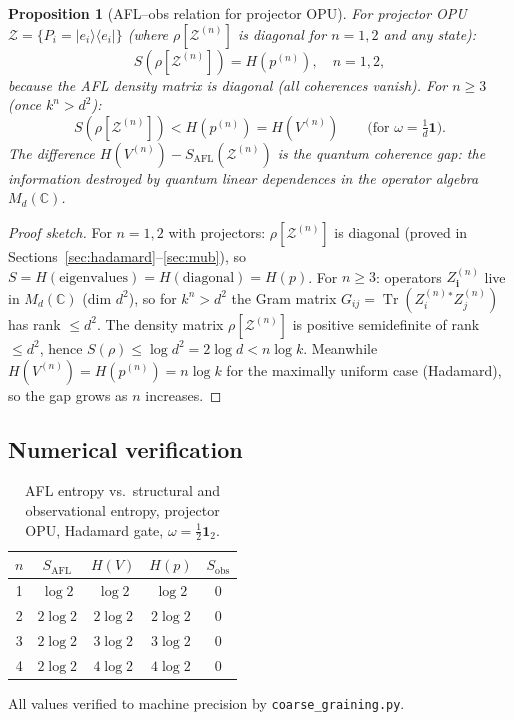 \documentclass[12pt,a4paper]{article}
\newtheorem{proposition}[theorem]{Proposition}
\DeclareMathOperator{\Tr}{Tr}
\begin{document}
\begin{proposition}[AFL--obs relation for projector OPU]\label{prop:afl_obs}
For projector OPU $\mathcal{Z}=\{P_i=|e_i\rangle\langle e_i|\}$ (where $\rho[\mathcal{Z}^{(n)}]$
is diagonal for $n=1,2$ and any state):
\begin{equation}\label{eq:afl_obs_proj}
  S(\rho[\mathcal{Z}^{(n)}]) = H(p^{(n)}), \quad n=1,2,
\end{equation}
because the AFL density matrix is diagonal (all coherences vanish).
For $n\geq 3$ (once $k^n>d^2$):
\begin{equation}\label{eq:quantum_gap}
  S(\rho[\mathcal{Z}^{(n)}])
  < H(p^{(n)}) = H(V^{(n)})
  \qquad\text{(for }\omega=\tfrac{1}{d}\mathbf{1}\text{).}
\end{equation}
The difference $H(V^{(n)})-S_{\mathrm{AFL}}(\mathcal{Z}^{(n)})$ is the
\emph{quantum coherence gap}: the information destroyed by quantum
linear dependences in the operator algebra $M_d(\mathbb{C})$.
\end{proposition}
\begin{proof}[Proof sketch]
For $n=1,2$ with projectors: $\rho[\mathcal{Z}^{(n)}]$ is diagonal
(proved in Sections~\ref{sec:hadamard}--\ref{sec:mub}), so
$S = H(\text{eigenvalues}) = H(\text{diagonal}) = H(p)$.
For $n\geq 3$: operators $Z^{(n)}_\mathbf{i}$ live in $M_d(\mathbb{C})$ (dim $d^2$),
so for $k^n>d^2$ the Gram matrix $G_{ij}=\Tr(Z^{(n)}_i{}^* Z^{(n)}_j)$ has
rank $\leq d^2$.  The density matrix $\rho[\mathcal{Z}^{(n)}]$ is positive
semidefinite of rank $\leq d^2$, hence $S(\rho)\leq\log d^2 = 2\log d < n\log k$.
Meanwhile $H(V^{(n)}) = H(p^{(n)}) = n\log k$ for the maximally uniform case
(Hadamard), so the gap grows as $n$ increases.
\end{proof}

\subsection{Numerical verification}

\begin{table}[h]
\centering
\caption{AFL entropy vs.\ structural and observational entropy, projector OPU,
Hadamard gate, $\omega=\frac{1}{2}\mathbf{1}_2$.}
\label{tab:obs_comparison}
\begin{tabular}{ccccc}
\hline
$n$ & $S_{\mathrm{AFL}}$ & $H(V)$ & $H(p)$ & $S_{\mathrm{obs}}$ \\
\hline
1 & $\log 2$ & $\log 2$ & $\log 2$ & $0$ \\
2 & $2\log 2$ & $2\log 2$ & $2\log 2$ & $0$ \\
3 & $2\log 2$ & $3\log 2$ & $3\log 2$ & $0$ \\
4 & $2\log 2$ & $4\log 2$ & $4\log 2$ & $0$ \\
\hline
\end{tabular}
\end{table}
\noindent All values verified to machine precision by \texttt{coarse\_graining.py}.
\end{document}
